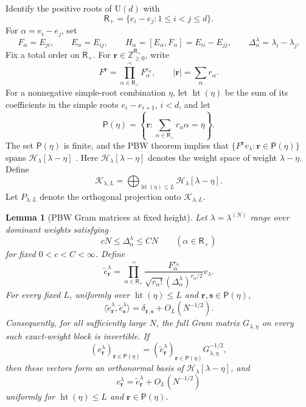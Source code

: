 \documentclass[11pt]{article}
\newtheorem{lemma}[lemma]{Lemma}
\theoremstyle{remark}
\theoremstyle{plain}
\newcommand{\cH}{\mathcal H}
\newcommand{\U}{\mathrm U}
\begin{document}
Identify the positive roots of \(\U(d)\) with
\[
  \mathsf R_+=\{e_i-e_j:1\le i<j\le d\}.
\]
For \(\alpha=e_i-e_j\), set
\[
  F_\alpha=E_{ji},
  \qquad E_\alpha=E_{ij},
  \qquad H_\alpha=[E_\alpha,F_\alpha]=E_{ii}-E_{jj},
  \qquad \Delta_\alpha^\lambda=\lambda_i-\lambda_j.
\]
Fix a total order on \(\mathsf R_+\).  For
\(\mathbf r\in\mathbb Z_{\ge0}^{\mathsf R_+}\), write
\[
  F^{\mathbf r}=\prod_{\alpha\in\mathsf R_+}^{\prec}F_\alpha^{r_\alpha},
  \qquad |\mathbf r|=\sum_\alpha r_\alpha.
\]
For a nonnegative simple-root combination \(\eta\), let
\(\operatorname{ht}(\eta)\) be the sum of its coefficients in the simple
roots \(e_i-e_{i+1}\), \(i<d\), and let
\[
  \mathsf P(\eta)
  =\left\{\mathbf r:\sum_{\alpha\in\mathsf R_+}r_\alpha\alpha=\eta\right\}.
\]
The set \(\mathsf P(\eta)\) is finite, and the PBW theorem implies that
\(\{F^{\mathbf r}v_\lambda:\mathbf r\in\mathsf P(\eta)\}\) spans
\(\cH_\lambda[\lambda-\eta]\) \cite{FultonHarris1991}.
Here \(\cH_\lambda[\lambda-\eta]\) denotes the weight space of weight
\(\lambda-\eta\).  Define
\begin{equation}\label{eq:PBW-height-subspace}
  \mathcal K_{\lambda,L}
  =\bigoplus_{\operatorname{ht}(\eta)\le L}
    \cH_\lambda[\lambda-\eta].
\end{equation}
Let \(P_{\lambda,L}\) denote the orthogonal projection onto
\(\mathcal K_{\lambda,L}\).

\begin{lemma}[PBW Gram matrices at fixed height]
\label{lem:PBW-fixed-height}
Let \(\lambda=\lambda^{(N)}\) range over dominant weights satisfying
\[
  cN\le\Delta_\alpha^\lambda\le CN
  \qquad(\alpha\in\mathsf R_+)
\]
for fixed \(0<c<C<\infty\).  Define
\begin{equation}\label{eq:normalized-PBW-vectors}
  \widetilde e_{\mathbf r}^\lambda
  =\prod_{\alpha\in\mathsf R_+}^{\prec}
   \frac{F_\alpha^{r_\alpha}}
        {\sqrt{r_\alpha!}(\Delta_\alpha^\lambda)^{r_\alpha/2}}
   v_\lambda.
\end{equation}
For every fixed \(L\), uniformly over
\(\operatorname{ht}(\eta)\le L\) and
\(\mathbf r,\mathbf s\in\mathsf P(\eta)\),
\begin{equation}\label{eq:PBW-Gram-fixed-height}
  \langle\widetilde e_{\mathbf r}^\lambda,
         \widetilde e_{\mathbf s}^\lambda\rangle
  =\delta_{\mathbf r,\mathbf s}+O_L(N^{-1/2}).
\end{equation}
Consequently, for all sufficiently large \(N\), the full Gram matrix
\(G_{\lambda,\eta}\) on every such exact-weight block is invertible.  If
\begin{equation}\label{eq:exact-block-orthonormalization}
  (e_{\mathbf r}^\lambda)_{\mathbf r\in\mathsf P(\eta)}
  =
  (\widetilde e_{\mathbf r}^\lambda)_{\mathbf r\in\mathsf P(\eta)}
  G_{\lambda,\eta}^{-1/2},
\end{equation}
then these vectors form an orthonormal basis of
\(\cH_\lambda[\lambda-\eta]\), and
\begin{equation}\label{eq:PBW-orthonormal-close}
  e_{\mathbf r}^\lambda
  =\widetilde e_{\mathbf r}^\lambda+O_L(N^{-1/2})
\end{equation}
uniformly for \(\operatorname{ht}(\eta)\le L\) and
\(\mathbf r\in\mathsf P(\eta)\).
\end{lemma}
\end{document}
